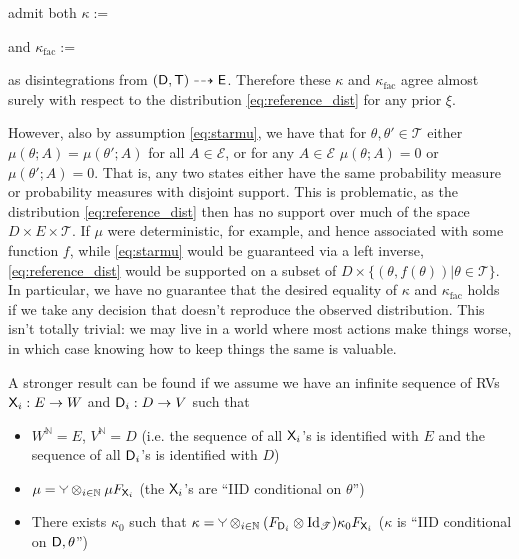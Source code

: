 admit both $\kappa:=$ and $\kappa_{\mathrm{fac}}:=$ as disintegrations from $(\mathsf{D},\mathsf{T})\dashrightarrow\mathsf{E}$. Therefore these $\kappa$ and $\kappa_{\mathrm{fac}}$ agree almost surely with respect to the distribution \ref{eq:reference_dist} for any prior $\xi$. 

However, also by assumption \ref{eq:starmu}, we have that for $\theta,\theta'\in \mathscr{T}$  either $\mu(\theta;A)=\mu(\theta';A)$ for all $A\in \mathcal{E}$, or for any $A\in\mathcal{E}$ $\mu(\theta;A)=0$ or $\mu(\theta';A)=0$. That is, any two states either have the same probability measure or probability measures with disjoint support. This is problematic, as the distribution \ref{eq:reference_dist} then has no support over much of the space $D\times E\times \mathscr{T}$. If $\mu$ were deterministic, for example, and hence associated with some function $f$, while \ref{eq:starmu} would be guaranteed via a left inverse, \ref{eq:reference_dist} would be supported on a subset of $D\times\{(\theta,f(\theta))|\theta\in\mathscr{T}\}$. In particular, we have no guarantee that the desired equality of $\kappa$ and $\kappa_{\mathrm{fac}}$ holds if we take any decision that doesn't reproduce the observed distribution. This isn't totally trivial: we may live in a world where most actions make things worse, in which case knowing how to keep things the same is valuable.

A stronger result can be found if we assume we have an infinite sequence of RVs $\mathsf{X}_i:E\to W$ and $\mathsf{D}_i:D\to V$ such that
\begin{itemize}
	\item $W^\mathbb{N}=E$, $V^\mathbb{N}=D$ (i.e. the sequence of all $\mathsf{X}_i$'s is identified with $E$ and the sequence of all $\mathsf{D}_i$'s is identified with $D$)
 	\item $\mu = \splitter{0.1} \otimes_{i\in \mathbb{N}} \mu F_{\RV{X}_i}$ (the $\mathsf{X}_i$'s are ``IID conditional on $\theta$'')
 	\item There exists $\kappa_0$ such that $\kappa = \splitter{0.1}\otimes_{i\in\mathbb{N}} (F_{\RV{D}_i}\otimes \mathrm{Id}_\mathscr{T}) \kappa_0 F_{\RV{X}_i}$ ($\kappa$ is ``IID conditional on $\mathsf{D},\theta$'')
 \end{itemize} 

